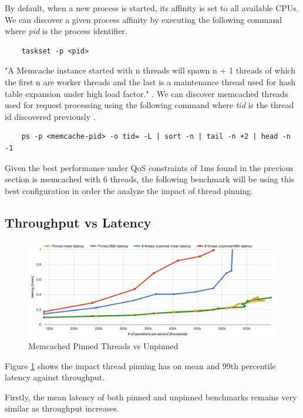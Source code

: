 By default, when a new process is started, its affinity is set to all available CPUs. We can discover a given process affinity by executing the following command where \textit{pid} is the process identifier.

\begin{lstlisting}
    taskset -p <pid>
\end{lstlisting}


"A Memcache instance started with n threads will spawn n + 1 threads of which the first n are worker threads and the last is a maintenance thread used for hash table expansion under high load factor." \cite{solarflarememcached}. We can discover memcached threads used for request processing using the following command where \textit{tid} is the thread id discovered previously \cite{solarflarememcached}.
\begin{lstlisting}
    ps -p <memcache-pid> -o tid= -L | sort -n | tail -n +2 | head -n -1
\end{lstlisting}

Given the best performance under QoS constraints of 1ms found in the previous section is memcached with 6 threads, the following benchmark will be using this best configuration in order the analyze the impact of thread pinning.

\subsection{Throughput vs Latency}

\begin{figure}[h]
    \includegraphics[width=\textwidth]{./res/5_threads_pinned.png}
    \caption{Memcached Pinned Threads vs Unpinned}
    \label{fig:memcached-threads-pinned}
\end{figure}

Figure \ref{fig:memcached-threads-pinned} shows the impact thread pinning has on mean and 99th percentile latency against throughput.

Firstly, the mean latency of both pinned and unpinned benchmarks remains very similar as throughput increases.

